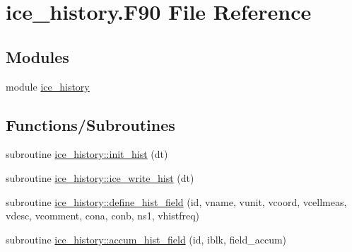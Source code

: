 \hypertarget{ice__history_8F90}{
\section{ice\_\-history.F90 File Reference}
\label{ice__history_8F90}
}
\subsection*{Modules}
\begin{DoxyCompactItemize}
\item 
module \hyperlink{namespaceice__history}{ice\_\-history}
\end{DoxyCompactItemize}
\subsection*{Functions/Subroutines}
\begin{DoxyCompactItemize}
\item 
subroutine \hyperlink{namespaceice__history_a99fbe7f0b61b42e909dad8bfff950536}{ice\_\-history::init\_\-hist} (dt)
\item 
subroutine \hyperlink{namespaceice__history_a09981e8df56a439fdddc4fcbb1066ecd}{ice\_\-history::ice\_\-write\_\-hist} (dt)
\item 
subroutine \hyperlink{namespaceice__history_a97e4c9d297248bf62ca51169bf82a846}{ice\_\-history::define\_\-hist\_\-field} (id, vname, vunit, vcoord, vcellmeas, vdesc, vcomment, cona, conb, ns1, vhistfreq)
\item 
subroutine \hyperlink{namespaceice__history_a16cf4059a24eed8a2908cecdba018383}{ice\_\-history::accum\_\-hist\_\-field} (id, iblk, field\_\-accum)
\end{DoxyCompactItemize}
